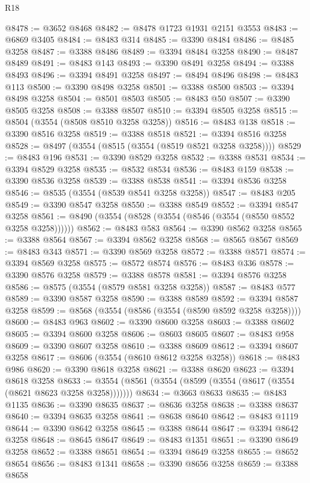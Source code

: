 \begin{lexlean}{R18}
\begin{coremodule}
@8478 := @3652 @8468
@8482 := @8478 @1723 @1931 @2151 @3553
@8483 := @6869 @3405
@8484 := @8483 @314
@8485 := @3390 @8484
@8486 := @8485 @3258
@8487 := @3388 @8486
@8489 := @3394 @8484 @3258
@8490 := @8487 @8489
@8491 := @8483 @143
@8493 := @3390 @8491 @3258
@8494 := @3388 @8493
@8496 := @3394 @8491 @3258
@8497 := @8494 @8496
@8498 := @8483 @113
@8500 := @3390 @8498 @3258
@8501 := @3388 @8500
@8503 := @3394 @8498 @3258
@8504 := @8501 @8503
@8505 := @8483 @50
@8507 := @3390 @8505 @3258
@8508 := @3388 @8507
@8510 := @3394 @8505 @3258
@8515 := @8504 (@3554 (@8508 @8510 @3258 @3258))
@8516 := @8483 @138
@8518 := @3390 @8516 @3258
@8519 := @3388 @8518
@8521 := @3394 @8516 @3258
@8528 := @8497 (@3554 (@8515 (@3554 (@8519 @8521 @3258 @3258))))
@8529 := @8483 @196
@8531 := @3390 @8529 @3258
@8532 := @3388 @8531
@8534 := @3394 @8529 @3258
@8535 := @8532 @8534
@8536 := @8483 @159
@8538 := @3390 @8536 @3258
@8539 := @3388 @8538
@8541 := @3394 @8536 @3258
@8546 := @8535 (@3554 (@8539 @8541 @3258 @3258))
@8547 := @8483 @205
@8549 := @3390 @8547 @3258
@8550 := @3388 @8549
@8552 := @3394 @8547 @3258
@8561 := @8490 (@3554 (@8528 (@3554 (@8546 (@3554 (@8550 @8552 @3258 @3258))))))
@8562 := @8483 @583
@8564 := @3390 @8562 @3258
@8565 := @3388 @8564
@8567 := @3394 @8562 @3258
@8568 := @8565 @8567
@8569 := @8483 @343
@8571 := @3390 @8569 @3258
@8572 := @3388 @8571
@8574 := @3394 @8569 @3258
@8575 := @8572 @8574
@8576 := @8483 @336
@8578 := @3390 @8576 @3258
@8579 := @3388 @8578
@8581 := @3394 @8576 @3258
@8586 := @8575 (@3554 (@8579 @8581 @3258 @3258))
@8587 := @8483 @577
@8589 := @3390 @8587 @3258
@8590 := @3388 @8589
@8592 := @3394 @8587 @3258
@8599 := @8568 (@3554 (@8586 (@3554 (@8590 @8592 @3258 @3258))))
@8600 := @8483 @963
@8602 := @3390 @8600 @3258
@8603 := @3388 @8602
@8605 := @3394 @8600 @3258
@8606 := @8603 @8605
@8607 := @8483 @958
@8609 := @3390 @8607 @3258
@8610 := @3388 @8609
@8612 := @3394 @8607 @3258
@8617 := @8606 (@3554 (@8610 @8612 @3258 @3258))
@8618 := @8483 @986
@8620 := @3390 @8618 @3258
@8621 := @3388 @8620
@8623 := @3394 @8618 @3258
@8633 := @3554 (@8561 (@3554 (@8599 (@3554 (@8617 (@3554 (@8621 @8623 @3258 @3258)))))))
@8634 := @3663 @8633
@8635 := @8483 @1135
@8636 := @3390 @8635
@8637 := @8636 @3258
@8638 := @3388 @8637
@8640 := @3394 @8635 @3258
@8641 := @8638 @8640
@8642 := @8483 @1119
@8644 := @3390 @8642 @3258
@8645 := @3388 @8644
@8647 := @3394 @8642 @3258
@8648 := @8645 @8647
@8649 := @8483 @1351
@8651 := @3390 @8649 @3258
@8652 := @3388 @8651
@8654 := @3394 @8649 @3258
@8655 := @8652 @8654
@8656 := @8483 @1341
@8658 := @3390 @8656 @3258
@8659 := @3388 @8658

\end{coremodule}
\end{lexlean}
